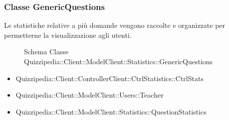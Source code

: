 \subsubsection{Classe GenericQuestions}
Le statistiche relative a più domande vengono raccolte e organizzate per permetterne la visualizzazione agli utenti.
\begin{figure}[H]
\centering
\noindent{}
\caption{Schema Classe Quizzipedia::Client::ModelClient::Statistics::GenericQuestions}
\end{figure}
\begin{itemize}
\item Quizzipedia::Client::ControllerClient::CtrlStatistics::CtrlStats
\item Quizzipedia::Client::ModelClient::Users::Teacher
\end{itemize}
\begin{itemize}
\item Quizzipedia::Client::ModelClient::Statistics::QuestionStatistics
\end{itemize}

